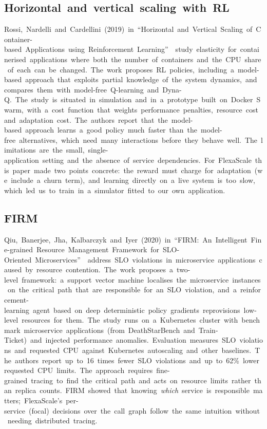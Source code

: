 \documentclass[12pt,a4paper,oneside]{report}
\begin{document}
\subsection{Horizontal~and~vertical~scaling~with~RL}

Rossi,~Nardelli~and~Cardellini~(2019)~in~``Horizontal~and~Vertical~Scaling~of~Container-based~Applications~using~Reinforcement~Learning''~\cite{rossi}~study~elasticity~for~containerised~applications~where~both~the~number~of~containers~and~the~CPU~share~of~each~can~be~changed.~The~work~proposes~RL~policies,~including~a~model-based~approach~that~exploits~partial~knowledge~of~the~system~dynamics,~and~compares~them~with~model-free~Q-learning~and~Dyna-Q.~The~study~is~situated~in~simulation~and~in~a~prototype~built~on~Docker~Swarm,~with~a~cost~function~that~weights~performance~penalties,~resource~cost~and~adaptation~cost.~The~authors~report~that~the~model-based~approach~learns~a~good~policy~much~faster~than~the~model-free~alternatives,~which~need~many~interactions~before~they~behave~well.~The~limitations~are~the~small,~single-application~setting~and~the~absence~of~service~dependencies.~For~FlexaScale~this~paper~made~two~points~concrete:~the~reward~must~charge~for~adaptation~(we~include~a~churn~term),~and~learning~directly~on~a~live~system~is~too~slow,~which~led~us~to~train~in~a~simulator~fitted~to~our~own~application.


\clearpage

\subsection{FIRM}

Qiu,~Banerjee,~Jha,~Kalbarczyk~and~Iyer~(2020)~in~``FIRM:~An~Intelligent~Fine-grained~Resource~Management~Framework~for~SLO-Oriented~Microservices''~\cite{firm}~address~SLO~violations~in~microservice~applications~caused~by~resource~contention.~The~work~proposes~a~two-level~framework:~a~support~vector~machine~localises~the~microservice~instances~on~the~critical~path~that~are~responsible~for~an~SLO~violation,~and~a~reinforcement-learning~agent~based~on~deep~deterministic~policy~gradients~reprovisions~low-level~resources~for~them.~The~study~runs~on~a~Kubernetes~cluster~with~benchmark~microservice~applications~(from~DeathStarBench~and~Train-Ticket)~and~injected~performance~anomalies.~Evaluation~measures~SLO~violations~and~requested~CPU~against~Kubernetes~autoscaling~and~other~baselines.~The~authors~report~up~to~16~times~fewer~SLO~violations~and~up~to~62\%~lower~requested~CPU~limits.~The~approach~requires~fine-grained~tracing~to~find~the~critical~path~and~acts~on~resource~limits~rather~than~replica~counts.~FIRM~showed~that~knowing~\textit{which}~service~is~responsible~matters;~FlexaScale's~per-service~(focal)~decisions~over~the~call~graph~follow~the~same~intuition~without~needing~distributed~tracing.
\end{document}
